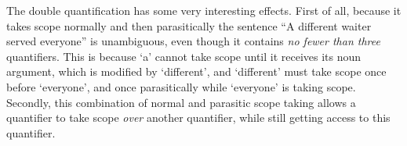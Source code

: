 \documentclass[a4paper]{article}
\begin{document}
The double quantification has some very interesting effects. First of
all, because it takes scope normally and then parasitically the
sentence ``A different waiter served everyone'' is unambiguous, even
though it contains \emph{no fewer than three} quantifiers. This is
because `a' cannot take scope until it receives its noun argument,
which is modified by `different', and `different' must take scope once
before `everyone', and once parasitically while `everyone' is taking
scope.
Secondly, this combination of normal and parasitic scope taking allows
a quantifier to take scope \emph{over} another quantifier, while still
getting access to this quantifier.







%
%
%





%
\end{document}
